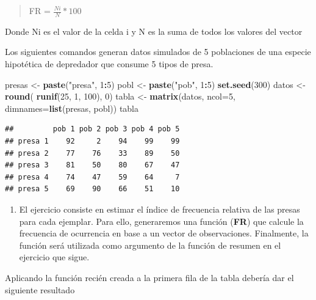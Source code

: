 \documentclass[]{book}
\newenvironment{Shaded}{\begin{snugshade}}{\end{snugshade}}
\newcommand{\DataTypeTok}[1]{\textcolor[rgb]{0.13,0.29,0.53}{#1}}
\newcommand{\DecValTok}[1]{\textcolor[rgb]{0.00,0.00,0.81}{#1}}
\newcommand{\KeywordTok}[1]{\textcolor[rgb]{0.13,0.29,0.53}{\textbf{#1}}}
\newcommand{\NormalTok}[1]{#1}
\newcommand{\OperatorTok}[1]{\textcolor[rgb]{0.81,0.36,0.00}{\textbf{#1}}}
\newcommand{\StringTok}[1]{\textcolor[rgb]{0.31,0.60,0.02}{#1}}
\providecommand{\tightlist}{%
  \setlength{\itemsep}{0pt}\setlength{\parskip}{0pt}}
\begin{document}
\begin{quote}
FR = \(\frac{Ni}{N}*100\)
\end{quote}

Donde Ni es el valor de la celda i y N es la suma de todos los valores del vector

Los siguientes comandos generan datos simulados de 5 poblaciones de una especie hipotética de depredador que consume 5 tipos de presa.

\begin{Shaded}
\begin{Highlighting}[]
\NormalTok{  presas <-}\StringTok{ }\KeywordTok{paste}\NormalTok{(}\StringTok{"presa"}\NormalTok{, }\DecValTok{1}\OperatorTok{:}\DecValTok{5}\NormalTok{)}
\NormalTok{  pobl <-}\StringTok{ }\KeywordTok{paste}\NormalTok{(}\StringTok{"pob"}\NormalTok{, }\DecValTok{1}\OperatorTok{:}\DecValTok{5}\NormalTok{)}
  \KeywordTok{set.seed}\NormalTok{(}\DecValTok{300}\NormalTok{)}
\NormalTok{  datos <-}\StringTok{ }\KeywordTok{round}\NormalTok{( }\KeywordTok{runif}\NormalTok{(}\DecValTok{25}\NormalTok{, }\DecValTok{1}\NormalTok{, }\DecValTok{100}\NormalTok{), }\DecValTok{0}\NormalTok{)}
\NormalTok{  tabla <-}\StringTok{ }\KeywordTok{matrix}\NormalTok{(datos, }\DataTypeTok{ncol=}\DecValTok{5}\NormalTok{, }\DataTypeTok{dimnames=}\KeywordTok{list}\NormalTok{(presas, pobl))}
\NormalTok{  tabla}
\end{Highlighting}
\end{Shaded}

\begin{verbatim}
##         pob 1 pob 2 pob 3 pob 4 pob 5
## presa 1    92     2    94    99    99
## presa 2    77    76    33    89    50
## presa 3    81    50    80    67    47
## presa 4    74    47    59    64     7
## presa 5    69    90    66    51    10
\end{verbatim}

\begin{enumerate}
\def\labelenumi{\arabic{enumi}.}
\tightlist
\item
  El ejercicio consiste en estimar el índice de frecuencia relativa de las presas para cada ejemplar. Para ello, generaremos una función (\textbf{FR}) que calcule la frecuencia de ocurrencia en base a un vector de observaciones. Finalmente, la función será utilizada como argumento de la función de resumen en el ejercicio que sigue.
\end{enumerate}

Aplicando la función recién creada a la primera fila de la tabla debería dar el siguiente resultado
\end{document}
